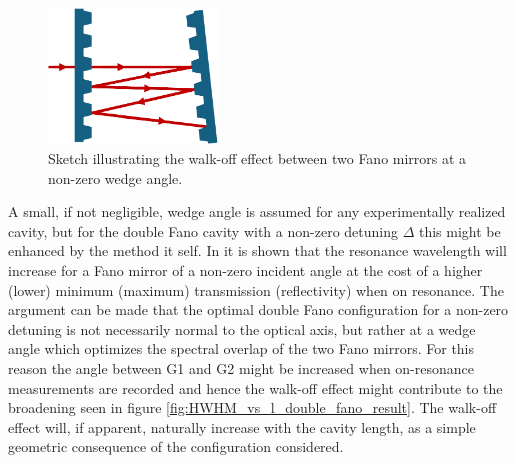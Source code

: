 \begin{figure}[h!]
    \centering
    \includegraphics[width=0.4\textwidth]{figures/walk_off_sketch.pdf}
    \caption{Sketch illustrating the walk-off effect between two Fano mirrors at a non-zero wedge angle.}
    \label{fig:walk_off_sketch}
\end{figure}

A small, if not negligible, wedge angle is assumed for any experimentally realized cavity, but for the double Fano cavity with a non-zero detuning $\Delta$ this might be enhanced by the method it self. In \cite{Parthenopoulos} it is shown that the resonance wavelength will increase for a Fano mirror of a non-zero incident angle at the cost of a higher (lower) minimum (maximum) transmission (reflectivity) when on resonance. The argument can be made that the optimal double Fano configuration for a non-zero detuning is not necessarily normal to the optical axis, but rather at a wedge angle which optimizes the spectral overlap of the two Fano mirrors. For this reason the angle between G1 and G2 might be increased when on-resonance measurements are recorded and hence the walk-off effect might contribute to the broadening seen in figure \ref{fig:HWHM_vs_l_double_fano_result}. The walk-off effect will, if apparent, naturally increase with the cavity length, as a simple geometric consequence of the configuration considered. 
